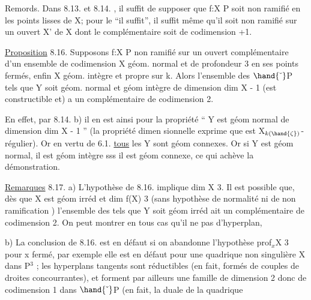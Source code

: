 


Remords. Dans 8.13. et 8.14. , il suffit de supposer que f:X\hand{$\to$} P soit non
ramifié en les points lisses de X; pour le ``il suffit'', il suffit même
qu'il soit non ramifié sur un ouvert X' de X dont le complémentaire soit
de codimension \hand{$\geqslant$} +1.

\uline{Proposition} 8.16. Supposons f:X\hand{$\to$} P non ramifié sur un ouvert
complémentaire d'un ensemble de codimension  X géom. normal et
de profondeur\hand{$\geqslant$} 3 en ses points fermés, enfin X géom. intègre et propre
sur k. Alors l'ensemble des \hand{$\zeta \in$} $\hand{\check{\ }}$P tels que 
Y\hand{$_\zeta$} soit géom. normal et géom intègre de dimension dim X - 1 (est
constructible et) a un complémentaire de codimension \hand{$\geqslant$} 2.

En effet, par 8.14. b) il en est ainsi pour la propriété
`` Y\hand{$_\zeta$} est géom normal de dimension dim X - 1 '' (la propriété dimen
sionnelle exprime que \hand{$\phi_\zeta$} est X$_{k(\hand{\zeta})}$-régulier). Or en vertu de 6.1.
\uline{tous} les Y\hand{$_\zeta$} sont géom connexes. Or si Y\hand{$_\zeta$} est géom normal, il est
géom intègre sss il est géom connexe, ce qui achève la démonstration.

\uline{Remarques} 8.17. a) L'hypothèse de 8.16. implique dim X \hand{$\geqslant$} 3. Il est possible que, dès que X est géom irréd
et dim f(X) \hand{$\geqslant$} 3 (sans hypothèse de normalité ni de non ramification )
l'ensemble des \hand{$\zeta$} tels que Y\hand{$_\zeta$} soit géom irréd ait un complémentaire
de codimension \hand{$\geqslant$}2. On peut montrer en tous cas qu'il ne pas
d'hyperplan, 

b) La conclusion de 8.16. est en défaut si on abandonne
l'hypothèse prof$_x$X \hand{$\geqslant$} 3 pour x fermé, par exemple elle est en défaut pour
une quadrique non singulière X dans P$^3$ ;   les hyperplans tangents
 sont  réductibles (en fait, formés de couples de droites
concourrantes), et forment par ailleurs une famille de dimension 2
 donc de codimension 1 dans $\hand{\check{\ }}$P (en fait, la duale de la quadrique  
